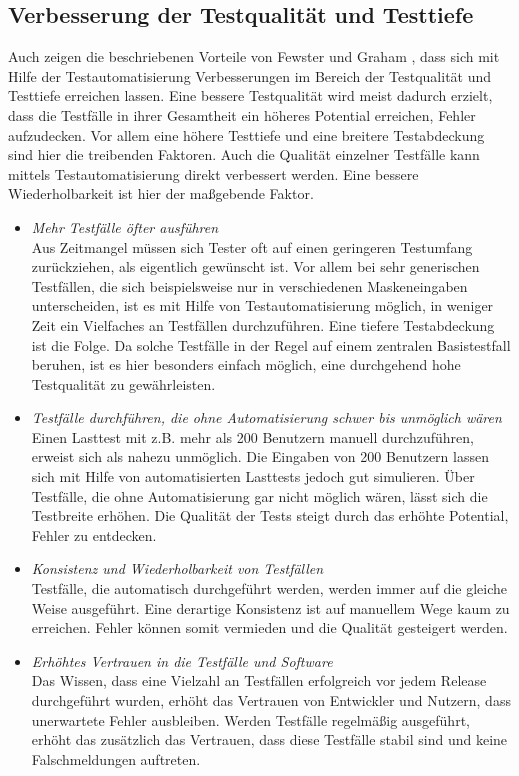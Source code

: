 \subsection{Verbesserung der Testqualität und Testtiefe}
\label{sec:verbesserung_der_testqualität_und_testtiefe}
Auch zeigen die beschriebenen Vorteile von Fewster und Graham \cite[vgl. S. 9 ff.]{fewster_software_1999}, dass sich mit Hilfe der Testautomatisierung Verbesserungen im Bereich der Testqualität und Testtiefe erreichen lassen. Eine bessere Testqualität wird meist dadurch erzielt, dass die Testfälle in ihrer Gesamtheit ein höheres Potential erreichen, Fehler aufzudecken. Vor allem eine höhere Testtiefe und eine breitere Testabdeckung sind hier die treibenden Faktoren. Auch die Qualität einzelner Testfälle kann mittels Testautomatisierung direkt verbessert werden. Eine bessere Wiederholbarkeit ist hier der maßgebende Faktor.


\begin{itemize}
\item \textit{Mehr Testfälle öfter ausführen} \\
Aus Zeitmangel müssen sich Tester oft auf einen geringeren Testumfang zurückziehen, als eigentlich gewünscht ist. Vor allem bei sehr generischen Testfällen, die sich beispielsweise nur in verschiedenen Maskeneingaben unterscheiden, ist es mit Hilfe von Testautomatisierung möglich, in weniger Zeit ein Vielfaches an Testfällen durchzuführen.
Eine tiefere Testabdeckung ist die Folge. Da solche Testfälle in der Regel auf einem zentralen Basistestfall beruhen, ist es hier besonders einfach möglich, eine durchgehend hohe Testqualität zu gewährleisten.
\item \textit{Testfälle durchführen, die ohne Automatisierung schwer bis unmöglich wären} \\
Einen Lasttest mit z.B. mehr als 200 Benutzern manuell durchzuführen, erweist sich als nahezu unmöglich. Die Eingaben von 200 Benutzern lassen sich mit Hilfe von automatisierten Lasttests jedoch gut simulieren. Über Testfälle, die ohne Automatisierung gar nicht möglich wären, lässt sich die Testbreite erhöhen. Die Qualität der Tests steigt durch das erhöhte Potential, Fehler zu entdecken.
\item \textit{Konsistenz und Wiederholbarkeit von Testfällen} \\
Testfälle, die automatisch durchgeführt werden, werden immer auf die gleiche Weise ausgeführt. Eine derartige Konsistenz ist auf manuellem Wege kaum zu erreichen. Fehler können somit vermieden und die Qualität gesteigert werden. 
\item \textit{Erhöhtes Vertrauen in die Testfälle und Software } \\
Das Wissen, dass eine Vielzahl an Testfällen erfolgreich vor jedem Release durchgeführt wurden, erhöht das Vertrauen von Entwickler und Nutzern, dass unerwartete Fehler ausbleiben.
Werden Testfälle regelmäßig ausgeführt, erhöht das zusätzlich das Vertrauen, dass diese Testfälle stabil sind und keine Falschmeldungen auftreten.
\end{itemize}


